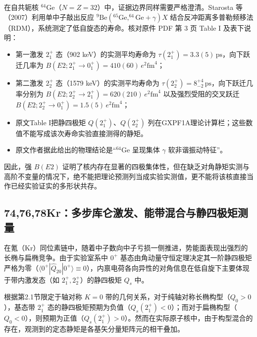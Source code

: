 在自共轭核 $^{64}\mathrm{Ge}$（$N=Z=32$）中，证据边界同样需要严格澄清。Starosta 等（2007）\cite{doctoral-r1-g26-starosta-2007-64ge-rdm-e2}利用单中子敲出反应 $^{9}\mathrm{Be}(^{65}\mathrm{Ge}, ^{64}\mathrm{Ge}+\gamma)X$ 结合反冲距离多普勒频移法（RDM），系统测定了低自旋态的寿命。核对原件 PDF 第 3 页 Table I 及表下说明：
\begin{itemize}
\item 第一激发 $2^+_1$ 态（902 keV）的实测平均寿命为 $\tau(2^+_1) = 3.3(5)\,\mathrm{ps}$，向下跃迁几率为 $B(E2; 2^+_1 \to 0^+_1) = 410(60)\,e^2\mathrm{fm}^4$；
\item 第二激发 $2^+_2$ 态（1579 keV）的实测平均寿命为 $\tau(2^+_2) = 8^{+4}_{-2}\,\mathrm{ps}$，向下跃迁几率分别为 $B(E2; 2^+_2 \to 2^+_1) = 620(210)\,e^2\mathrm{fm}^4$ 以及强烈受阻的交叉跃迁 $B(E2; 2^+_2 \to 0^+_1) = 1.5(5)\,e^2\mathrm{fm}^4$；
\item 原文Table I把静四极矩 $Q(2_1^+)$、$Q(2_2^+)$ 列在GXPF1A理论计算栏；这些数值不能写成该次寿命实验直接测得的静矩。
\item 原文作者据此给出的物理结论是``$^{64}\mathrm{Ge}$ 呈现集体 $\gamma$ 软非谐振动特征''。
\end{itemize}
因此，强 $B(E2)$ 证明了核内存在显著的四极集体性，但在缺乏对角静矩实测与高阶不变量的情况下，绝不能把理论预测列当成实验实测值，更不能将该核直接当作已经实验证实的多形状共存。

\subsection{74,76,78Kr：多步库仑激发、能带混合与静四极矩测量}\label{sec:4-2-3}

在氪（$\mathrm{Kr}$）同位素链中，随着中子数向中子亏损一侧推进，势能面表现出强烈的长椭与扁椭竞争。由于实验室系中 $0^+$ 基态由角动量守恒定理决定其一阶静四极矩严格为零（$\langle 0^+ | \hat{Q}_{20} | 0^+ \rangle \equiv 0$），内禀电荷各向异性的对角信息在低自旋下主要体现于带内激发态（如 $2^+_1, 2^+_2$）的静四极矩 $Q_s$ 中。

根据第2.1节限定于轴对称 $K=0$ 带的几何关系，对于纯轴对称长椭构型（$Q_0 > 0$），基态带 $2^+_1$ 态的静四极矩预期为负值（$Q_s(2^+_1) < 0$）；而对于扁椭构型（$Q_0 < 0$），则预期为正值（$Q_s(2^+_1) > 0$）。然而在实际原子核中，由于构型混合的存在，观测到的定态静矩是各基矢分量矩阵元的相干叠加。

